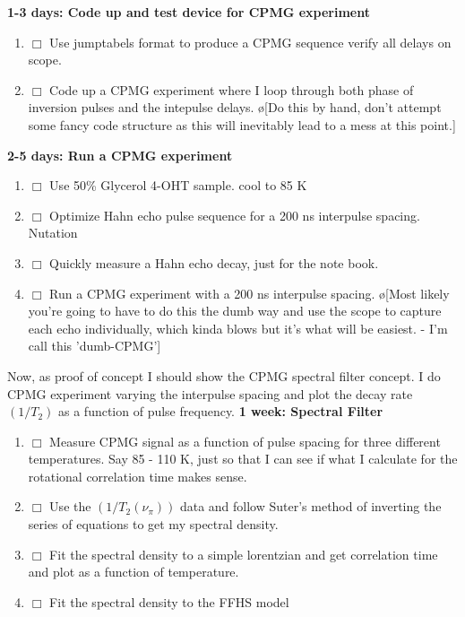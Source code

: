 \documentclass[10pt]{book}
\begin{document}
{{\bf 1-3 days: Code up and test device for CPMG experiment}
\begin{enumerate}
    \item $\Box$ Use jumptabels format to produce a CPMG sequence verify all delays on scope.
    \item $\Box$ Code up a CPMG experiment where I loop through both phase of inversion pulses and the intepulse delays. \o[Do this by hand, don't attempt some fancy code structure as this will inevitably lead to a mess at this point.]{}\\
\end{enumerate}


{\bf 2-5 days: Run a CPMG experiment}
\begin{enumerate}
    \item $\Box$ Use 50\% Glycerol 4-OHT sample. cool to 85 K
    \item $\Box$ Optimize Hahn echo pulse sequence for a 200 ns interpulse spacing. Nutation
    \item $\Box$ Quickly measure a Hahn echo decay, just for the note book.
    \item $\Box$ Run a CPMG experiment with a 200 ns interpulse spacing. \o[Most likely you're going to have to do this the dumb way and use the scope to capture each echo individually, which kinda blows but it's what will be easiest. - I'm call this 'dumb-CPMG']{}\\
\end{enumerate}

Now, as proof of concept I should show the CPMG spectral filter concept. I do CPMG experiment varying the interpulse spacing and plot the decay rate $(1/T_2)$ as a function of pulse frequency.
{\bf 1 week: Spectral Filter}
\begin{enumerate}
    \item $\Box$ Measure CPMG signal as a function of pulse spacing for three different temperatures. Say 85 - 110 K, just so that I can see if what I calculate for the rotational correlation time makes sense.
    \item $\Box$ Use the $(1/T_2(\nu_{\pi}))$ data and follow Suter's method of inverting the series of equations to get my spectral density.
    \item $\Box$ Fit the spectral density to a simple lorentzian and get correlation time and plot as a function of temperature.
    \item $\Box$ Fit the spectral density to the FFHS model\\
\end{enumerate}

}
\end{document}
